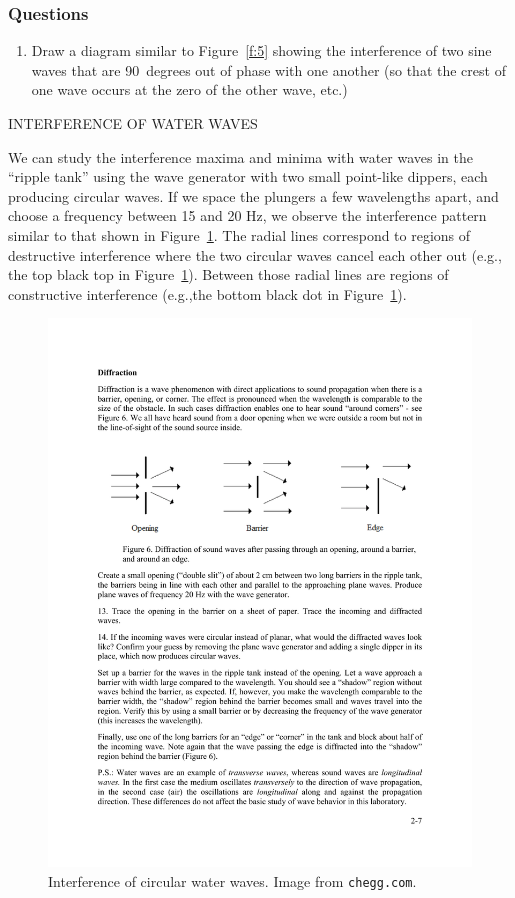 \documentclass[11pt]{NSF}
\def\ben{\begin{enumerate}}
\def\een{\end{enumerate}}
\def\i{\item{}}
\begin{document}
\subsubsection*{Questions}
\ben

\i Draw a diagram similar to Figure~\ref{f:5} 
showing the interference of two sine waves that are 90~degrees
out of phase with one another 
(so that the crest of one wave occurs at the zero of the other wave, etc.)

\een

INTERFERENCE OF WATER WAVES

We can study the interference maxima and minima with water waves in the 
``ripple tank” using the wave generator with two small point-like dippers, 
each producing circular waves. 
If we space the plungers a few wavelengths apart, and choose a 
frequency between 15 and 20 Hz, we observe the interference pattern
similar to that shown in Figure~\ref{f:6}.
The radial lines correspond to regions of destructive interference
where the two circular waves cancel each other out (e.g., the 
top black top in Figure~\ref{f:6}).
Between those radial lines are regions of constructive interference
(e.g.,the bottom black dot in Figure~\ref{f:6}).
%
\begin{figure}[hbtp]
\begin{center}
\includegraphics[width=.6\textwidth]{fig2_6}
\caption{Interference of circular water waves.
Image from {\tt chegg.com}.}
\label{f:6}
\end{center}
\end{figure}
%
\end{document}
